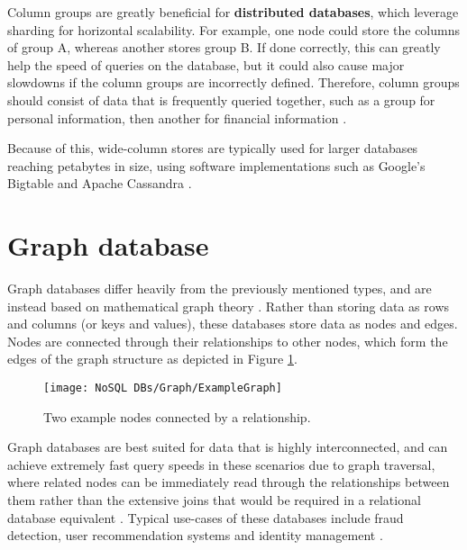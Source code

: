 \noindent Column groups are greatly beneficial for \textbf{distributed databases}, which leverage sharding for horizontal scalability. For example,
one node could store the columns of group A, whereas another stores group B. If done correctly, this can greatly help the speed of queries
on the database, but it could also cause major slowdowns if the column groups are incorrectly defined. Therefore, column groups should 
consist of data that is frequently queried together, such as a group for personal information, then another for financial information \autocite{cattellScalableSQLNoSQL2011}. 


\para Because of this, wide-column stores are typically used for larger databases reaching petabytes in size, using software implementations such as 
Google's Bigtable \autocite{changBigtableDistributedStorage2008} and Apache Cassandra \autocite{apacheApacheCassandraApache}.


\section{Graph database}
Graph databases differ heavily from the previously mentioned types, and are instead based on mathematical graph theory \autocite{awsWhatGraphDatabase}.
Rather than storing data as rows and columns (or keys and values), these 
databases store data as nodes and edges. Nodes are connected through their relationships to other nodes, which form the edges of the graph 
structure as depicted in Figure \ref{fig:ExampleGraph}.

\begin{figure}[H]
    \centering
    \texttt{[image: NoSQL DBs/Graph/ExampleGraph]}
    \caption{Two example nodes connected by a relationship. \autocite{neo4jWhatGraphDatabase}\label{fig:ExampleGraph}}
\end{figure}

\noindent Graph databases are best suited for data that is highly interconnected, and can achieve extremely fast query speeds in these scenarios
due to graph traversal, where related nodes can be immediately read through the relationships between them rather than the extensive joins
that would be required in a relational database equivalent \autocite{corbelliniPersistingBigdataNoSQL2017}. Typical use-cases of these 
databases include fraud detection, user recommendation systems and identity management \autocite{neo4jGraphDatabaseUse,awsManagedGraphDatabase,memgraphGraphDatabaseVs}.

